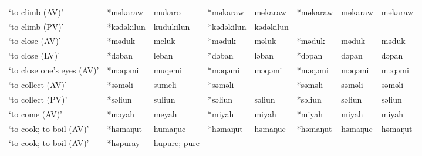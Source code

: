\begin{landscape}
\begin{longtable}[c]{@{}p{3cm}<{\raggedright}p{2.75cm}<{\raggedright}p{2.75cm}<{\raggedright}p{2.75cm}<{\raggedright}p{2.75cm}<{\raggedright}p{2.75cm}<{\raggedright}p{2.75cm}<{\raggedright}p{2.75cm}<{\raggedright}@{}}
`to climb (AV)'                                      & *məkaraw     & mukaro                        & *məkaraw       & məkaraw                    & *məkaraw         & məkaraw                  & məkaraw                           \\
`to climb (PV)'                                      & *kədəkilun   & kudukilun                     & *kədəkilun     & kədəkilun                  &                  &                          &                                   \\
`to close (AV)'                                      & *məduk       & meluk                         & *məduk         & məluk                      & *məduk           & məduk                    & məduk                             \\
`to close (LV)'                                      & *dəban       & leban                         & *dəban         & ləban                      & *dəpan           & dəpan                    & dəpan                             \\
`to close one's eyes (AV)'                           & *məqəmi      & muqemi                        & *məqəmi        & məqəmi                     & *məqəmi          & məqəmi                   & məqəmi                            \\
`to collect (AV)'                                    & *səməli      & sumeli                        & *səməli        &                            & *səməli          & səməli                   & səməli                            \\
`to collect (PV)'                                    & *səliun      & suliun                        & *səliun        & səliun                     & *səliun          & səliun                   & səliun                            \\
`to come (AV)'                                       & *məyah       & meyah                         & *miyah         & miyah                      & *miyah           & miyah                    & miyah                             \\
`to cook; to boil (AV)'                              & *həmaŋut     & humaŋuc                       & *həmaŋut       & həmaŋuc                    & *həmaŋut         & həmaŋuc                  & həmaŋut                           \\
`to cook; to boil (AV)'                              & *həpuray     & hupure; pure                  &                &                            &                  &                          &                                   \\

\end{longtable}
\end{landscape}
